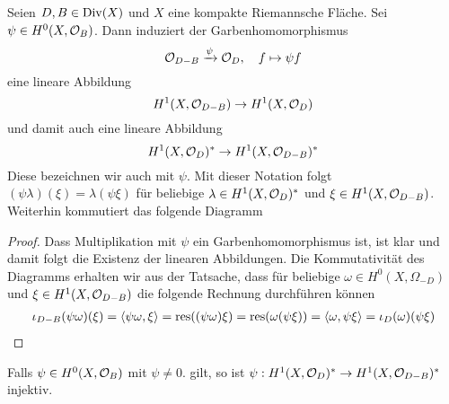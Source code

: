 \begin{lemma}
  Seien $D,B \in \operatorname{Div}(X)$ und $X$ eine kompakte Riemannsche
  Fläche. Sei $\psi \in H^0(X,\mathcal{O}_B)$. Dann induziert der
  Garbenhomomorphismus
  \[
  \mathcal{O}_{D-B} \xrightarrow{\psi} \mathcal{O}_D, \quad f \mapsto \psi f
  \] 
  eine lineare Abbildung
  \[
  H^1(X, \mathcal{O}_{D-B}) \rightarrow H^1(X, \mathcal{O}_D)
  \]
  und damit auch eine lineare Abbildung
  \[
  H^1(X, \mathcal{O}_D)^\ast \rightarrow H^1(X, \mathcal{O}_{D-B})^\ast
  \]
  Diese bezeichnen wir auch mit $\psi$. Mit dieser Notation folgt
  $(\psi \lambda)(\xi) = \lambda(\psi \xi)$ für beliebige $\lambda \in
  H^1(X, \mathcal{O}_D)^\ast$ und $\xi \in H^1(X, \mathcal{O}_{D-B})$. Weiterhin
  kommutiert das folgende Diagramm
  \begin{center}
  \end{center}
\end{lemma}

\begin{proof}
  Dass Multiplikation mit $\psi$ ein Garbenhomomorphismus ist, ist klar
  und damit folgt die Existenz der linearen Abbildungen. Die
  Kommutativität des Diagramms erhalten wir aus der Tatsache, dass für
  beliebige $\omega \in H^0(X, \Omega_{-D})$ und $\xi \in H^1(X,
  \mathcal{O}_{D-B})$ die folgende Rechnung durchführen können
  \begin{align*}
    \iota_{D-B}(\psi \omega)(\xi) = \langle \psi \omega, \xi \rangle = \operatorname{res}((\psi
    \omega) \xi) = \operatorname{res}(\omega (\psi \xi)) = \langle \omega, \psi \xi \rangle =
    \iota_D(\omega)(\psi \xi)
  \end{align*}
\end{proof}

\begin{lemma}
  \label{lemma:psi-inj}
  Falls $\psi \in H^0(X, \mathcal{O}_B)$ mit $\psi \neq 0$. gilt, so ist $\psi:
  H^1(X, \mathcal{O}_D)^\ast \rightarrow H^1(X, \mathcal{O}_{D-B})^\ast$ injektiv.
\end{lemma}

